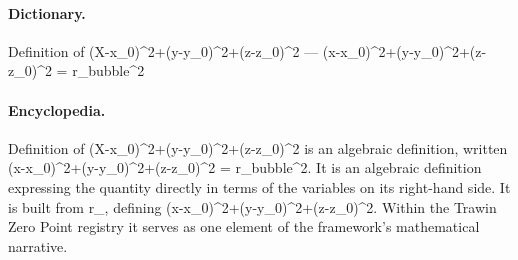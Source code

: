 \paragraph{Dictionary.}
Definition of (X-x\_0)\textasciicircum{}2+(y-y\_0)\textasciicircum{}2+(z-z\_0)\textasciicircum{}2 — (x-x\_0)\textasciicircum{}2+(y-y\_0)\textasciicircum{}2+(z-z\_0)\textasciicircum{}2 = r\_bubble\textasciicircum{}2

\paragraph{Encyclopedia.}
Definition of (X-x\_0)\textasciicircum{}2+(y-y\_0)\textasciicircum{}2+(z-z\_0)\textasciicircum{}2 is an algebraic definition, written (x-x\_0)\textasciicircum{}2+(y-y\_0)\textasciicircum{}2+(z-z\_0)\textasciicircum{}2 = r\_bubble\textasciicircum{}2. It is an algebraic definition expressing the quantity directly in terms of the variables on its right-hand side. It is built from r\_, defining (x-x\_0)\textasciicircum{}2+(y-y\_0)\textasciicircum{}2+(z-z\_0)\textasciicircum{}2. Within the Trawin Zero Point registry it serves as one element of the framework's mathematical narrative.

